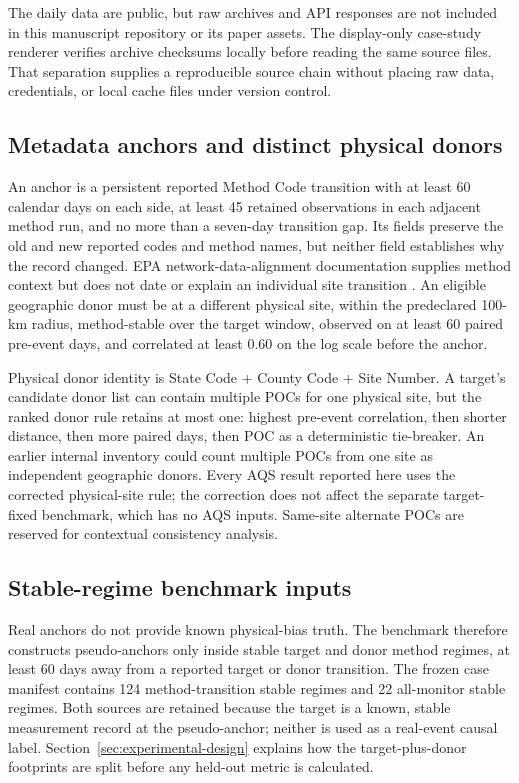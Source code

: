 The daily data are public, but raw archives and API responses are not included
in this manuscript repository or its paper assets. The display-only case-study
renderer verifies archive checksums locally before reading the same source
files. That separation supplies a reproducible source chain without placing
raw data, credentials, or local cache files under version control.

\subsection{Metadata anchors and distinct physical donors}

An anchor is a persistent reported Method Code transition with at least 60
calendar days on each side, at least 45 retained observations in each adjacent
method run, and no more than a seven-day transition gap. Its fields preserve
the old and new reported codes and method names, but neither field establishes
why the record changed. EPA network-data-alignment documentation supplies
method context but does not date or explain an individual site transition
\citep{epa_t640_alignment}. An eligible geographic donor must be at a different
physical site, within the predeclared 100-km radius, method-stable over the
target window, observed on at least 60 paired pre-event days, and correlated
at least 0.60 on the log scale before the anchor.

Physical donor identity is State Code + County Code + Site Number. A target's
candidate donor list can contain multiple POCs for one physical site, but the
ranked donor rule retains at most one: highest pre-event correlation, then
shorter distance, then more paired days, then POC as a deterministic
tie-breaker. An earlier internal inventory could count multiple POCs from one site as
independent geographic donors. Every AQS result reported here uses the
corrected physical-site rule; the correction does not affect the separate
target-fixed benchmark, which has no AQS inputs. Same-site alternate POCs are
reserved for contextual consistency analysis.

\subsection{Stable-regime benchmark inputs}

Real anchors do not provide known physical-bias truth. The benchmark therefore
constructs pseudo-anchors only inside stable target and donor method regimes,
at least 60 days away from a reported target or donor transition. The frozen
case manifest contains 124 method-transition stable regimes and 22
all-monitor stable regimes. Both sources are retained because the target is a
known, stable measurement record at the pseudo-anchor; neither is used as a
real-event causal label. Section~\ref{sec:experimental-design} explains how
the target-plus-donor footprints are split before any held-out metric is
calculated.

